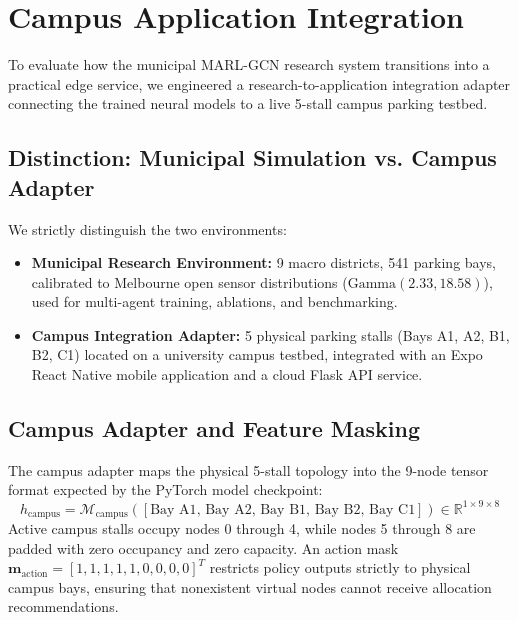 \documentclass[journal]{IEEEtran}
\begin{document}
\section{Campus Application Integration}
\label{sec:campus}

To evaluate how the municipal MARL-GCN research system transitions into a practical edge service, we engineered a research-to-application integration adapter connecting the trained neural models to a live 5-stall campus parking testbed.

\subsection{Distinction: Municipal Simulation vs. Campus Adapter}
We strictly distinguish the two environments:
\begin{itemize}
    \item \textbf{Municipal Research Environment:} 9 macro districts, 541 parking bays, calibrated to Melbourne open sensor distributions ($\text{Gamma}(2.33, 18.58)$), used for multi-agent training, ablations, and benchmarking.
    \item \textbf{Campus Integration Adapter:} 5 physical parking stalls (Bays A1, A2, B1, B2, C1) located on a university campus testbed, integrated with an Expo React Native mobile application and a cloud Flask API service.
\end{itemize}

\subsection{Campus Adapter and Feature Masking}
The campus adapter maps the physical 5-stall topology into the 9-node tensor format expected by the PyTorch model checkpoint:
\begin{equation}
h_{\text{campus}} = \mathcal{M}_{\text{campus}}\left( [\text{Bay A1}, \, \text{Bay A2}, \, \text{Bay B1}, \, \text{Bay B2}, \, \text{Bay C1}] \right) \in \mathbb{R}^{1 \times 9 \times 8}
\end{equation}
Active campus stalls occupy nodes 0 through 4, while nodes 5 through 8 are padded with zero occupancy and zero capacity. An action mask $\mathbf{m}_{\text{action}} = [1, 1, 1, 1, 1, 0, 0, 0, 0]^T$ restricts policy outputs strictly to physical campus bays, ensuring that nonexistent virtual nodes cannot receive allocation recommendations.
\end{document}
